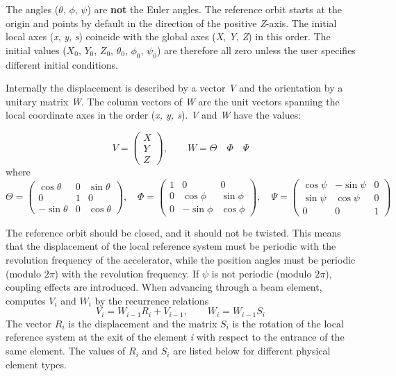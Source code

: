 The angles ($\theta$, $\phi$, $\psi$) are {\bf not} the Euler
angles. The reference orbit starts at the origin and points by default
in the direction of the positive {\it Z}-axis. The initial local axes
({\it x}, {\it y}, {\it s})  coincide with the global axes
({\it X}, {\it Y}, {\it Z}) in this order. The initial values
($X_0$, $Y_0$, $Z_0$, $\theta_0$, $\phi_0$, $\psi_0$) are therefore all zero
unless the user specifies different initial conditions.  

Internally the displacement is described by a vector {\it V} and the
orientation by a unitary matrix {\it W}. The column vectors of
{\it W} are the unit vectors spanning  the local coordinate axes in
the order ({\it x, y, s}). {\it V} and {\it W} have the values:  

\begin{equation}
V =
 \begin{pmatrix}
  X \\
  Y \\
  Z
 \end{pmatrix}
, \qquad
W=\Theta \quad \Phi \quad \Psi
\end{equation}
 where 
\begin{equation}
\Theta =
 \begin{pmatrix}
  \cos \theta  & 0 &  \sin \theta \\
  0            & 1 &  0 \\
  -\sin \theta & 0 &  \cos \theta
 \end{pmatrix}
, \quad
\Phi =
 \begin{pmatrix}
  1 & 0          &  0 \\
  0 & \cos \phi  &  \sin \phi \\
  0 & -\sin \phi &  \cos \phi
 \end{pmatrix}
, \quad
\Psi =
 \begin{pmatrix}
  \cos \psi &  -\sin \psi & 0 \\
  \sin \psi &  \cos \psi  & 0 \\
  0	    &	0	  & 1 
 \end{pmatrix}
\end{equation}

The reference orbit should be closed, and it should not be twisted. 
This means that the displacement of the local reference system must be
periodic with the revolution frequency of the accelerator, while the
position angles must be periodic (modulo $2\pi$) with the revolution
frequency. If $\psi$ is not periodic (modulo $2\pi$), coupling effects are
introduced. 
When advancing through a beam element, \madx computes
$V_i$ and $W_i$ by the recurrence relations  
\begin{equation}
   V_i=W_{i-1}R_i+V_{i-1},
   \qquad
   W_i=W_{i-1}S_i
\end{equation}
The vector $R_i$ is the displacement and the matrix
$S_i$ is the rotation of the local reference system  at the
exit of the element {\it i} with respect to the entrance  of the same
element. The values of $R_i$ and $S_i$ are listed below
for different physical element types.  


